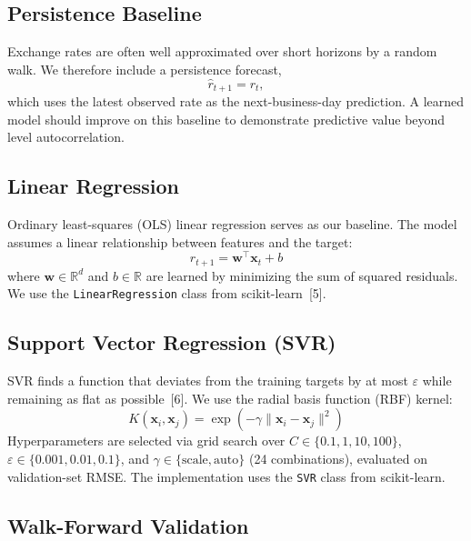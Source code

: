 \documentclass{article}
\begin{document}
\subsection{Persistence Baseline}

Exchange rates are often well approximated over short horizons by a random walk. We therefore include a persistence forecast,
\begin{equation}
  \hat{r}_{t+1} = r_t,
\end{equation}
which uses the latest observed rate as the next-business-day prediction. A learned model should improve on this baseline to demonstrate predictive value beyond level autocorrelation.

\subsection{Linear Regression}

Ordinary least-squares (OLS) linear regression serves as our baseline. The model assumes a linear relationship between features and the target:
\begin{equation}
  \hat{r}_{t+1} = \mathbf{w}^\top \mathbf{x}_t + b
\end{equation}
where $\mathbf{w} \in \mathbb{R}^d$ and $b \in \mathbb{R}$ are learned by minimizing the sum of squared residuals. We use the \texttt{LinearRegression} class from scikit-learn~[5].

\subsection{Support Vector Regression (SVR)}

SVR finds a function that deviates from the training targets by at most $\varepsilon$ while remaining as flat as possible~[6]. We use the radial basis function (RBF) kernel:
\begin{equation}
  K(\mathbf{x}_i, \mathbf{x}_j) = \exp\!\left(-\gamma \|\mathbf{x}_i - \mathbf{x}_j\|^2\right)
\end{equation}
Hyperparameters are selected via grid search over $C \in \{0.1, 1, 10, 100\}$, $\varepsilon \in \{0.001, 0.01, 0.1\}$, and $\gamma \in \{\text{scale}, \text{auto}\}$ (24 combinations), evaluated on validation-set RMSE. The implementation uses the \texttt{SVR} class from scikit-learn.

\subsection{Walk-Forward Validation}
\end{document}
